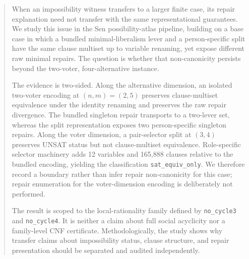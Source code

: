 \begin{abstract}
When an impossibility witness transfers to a larger finite case, its repair
explanation need not transfer with the same representational guarantees.
We study this issue in the Sen possibility-atlas pipeline, building on a base
case in which a bundled minimal-liberalism lever and a person-specific split
have the same clause multiset up to variable renaming, yet expose different raw
minimal repairs.  The question is whether that non-canonicity persists beyond
the two-voter, four-alternative instance.

The evidence is two-sided.  Along the alternative dimension, an isolated
two-voter encoding at $(n,m)=(2,5)$ preserves clause-multiset equivalence under
the identity renaming and preserves the raw repair divergence.  The bundled
singleton repair  transports to a two-lever set, whereas the split
representation exposes two person-specific singleton repairs.  Along the voter
dimension, a pair-selector split at $(3,4)$ preserves UNSAT status but not
clause-multiset equivalence.  Role-specific selector machinery adds 12
variables and 165,888 clauses relative to the bundled encoding, yielding the
classification \texttt{sat\_equiv\_only}.  We therefore record a boundary
rather than infer repair non-canonicity for this case; repair enumeration for
the voter-dimension encoding is deliberately not performed.

The result is scoped to the local-rationality family defined by
\texttt{no\_cycle3} and \texttt{no\_cycle4}.  It is neither a claim about full
social acyclicity nor a family-level CNF certificate.  Methodologically, the
study shows why transfer claims about impossibility status, clause structure,
and repair presentation should be separated and audited independently.
\end{abstract}
